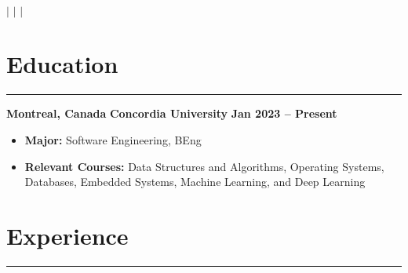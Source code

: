 \documentclass[10pt]{article}
\begin{document}
\newpage

\begin{center}
    {\Huge \textbf{\fullname}} \\
    \vspace{1mm}
    {\small 
    \faPhone \hspace{0mm} \href{tel:+15149445977}{\phone} $\vert$ 
    \faEnvelope \hspace{0mm} \href{mailto:massimo02caruso@gmail.com}{\email} $\vert$ 
    \faLinkedin \hspace{0mm} \href{https://linkedin.com/in/massimocaruso}{\linkedin} $\vert$ 
    \faGithub \hspace{0mm} \href{https://github.com/Extinctable}{\github}
    }
\end{center}

\vspace{-8mm}


\section*{Education}
\vspace{-2mm}
\hrule
\vspace{0mm}

\textbf{Montreal, Canada} \hfill \textbf{Concordia University} \hfill \textbf{Jan 2023 -- Present} 
\vspace{-4mm}
\begin{itemize}[left=0.15in, itemsep=0pt]
    \item \textbf{Major:} Software Engineering, BEng
    \item \textbf{Relevant Courses:} Data Structures and Algorithms, Operating Systems, Databases, Embedded Systems, Machine Learning, and Deep Learning
\end{itemize}


\vspace{-6mm} %
\section*{Experience}
\vspace{-2mm}
\hrule
\vspace{0mm}
\end{document}
